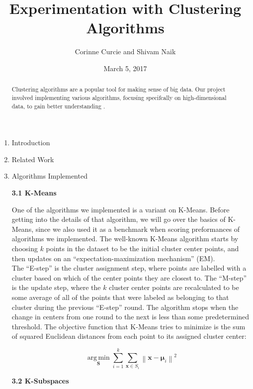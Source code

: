 \documentclass[12pt]{article}
\begin{document}
\title{Experimentation with Clustering Algorithms}

\author{Corinne Curcie and Shivam Naik}
\date{March 5, 2017}

\maketitle

\begin{abstract}
Clustering algorithms are a popular tool for making sense of big data. Our project involved implementing various algorithms, focusing specifcally on high-dimensional data, to gain better understanding . 
\end{abstract}


\begin{enumerate}

\item Introduction

\item Related Work

\item Algorithms Implemented

\textbf{3.1 K-Means}

One of the algorithms we implemented is a variant on K-Means. Before getting into the details of that algorithm, we will go over the basics of K-Means, since we also used it as a benchmark when scoring preformances of algorithms we implemented. The well-known K-Means algorithm starts by choosing $k$ points in the dataset to be the initial cluster center points, and then updates on an ``expectation-maximization mechanism'' (EM).\\
 The ``E-step'' is the cluster assignment step, where points are labelled with a cluster based on which of the center points they are closest to. The ``M-step'' is the update step, where the $k$ cluster center points are recalculated to be some average of all of the points that were labeled as belonging to that cluster during the previous ``E-step'' round. The algorithm stops when the change in centers from one round to the next is less than some predetermined threshold. The objective function that K-Means tries to minimize is the sum of squared Euclidean distances from each point to its assigned cluster center:

$$ {\underset {\mathbf {S} }{\operatorname {arg\,min} }}\sum _{i=1}^{k}\sum _{\mathbf {x} \in S_{i}}\left\|\mathbf {x} -{\boldsymbol {\mu }}_{i}\right\|^{2} $$

\textbf{3.2 K-Subspaces}


\end{enumerate}
\end{document}
